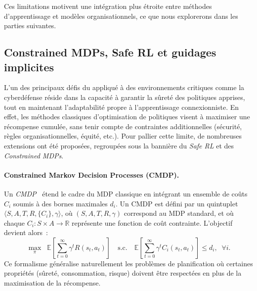 Ces limitations motivent une intégration plus étroite entre méthodes d'apprentissage et modèles organisationnels, ce que nous explorerons dans les parties suivantes.



\subsection{Constrained MDPs, Safe RL et guidages implicites}

\noindent
L’un des principaux défis du  appliqué à des environnements critiques
comme la cyberdéfense réside dans la capacité à garantir la sûreté des politiques apprises,
tout en maintenant l’adaptabilité propre à l’apprentissage connexionniste.
En effet, les méthodes classiques d’optimisation de politiques visent à maximiser une récompense cumulée,
sans tenir compte de contraintes additionnelles (sécurité, règles organisationnelles, équité, etc.).
Pour pallier cette limite, de nombreuses extensions ont été proposées, regroupées sous la bannière
du \textit{Safe RL} et des \textit{Constrained MDPs}.

\paragraph{Constrained Markov Decision Processes (CMDP).}
Un \textit{CMDP}~\cite{altman1999constrained} étend le cadre du MDP classique en intégrant
un ensemble de coûts $C_i$ soumis à des bornes maximales $d_i$.
Un CMDP est défini par un quintuplet
$\langle S, A, T, R, \{C_i\}, \gamma \rangle$,
où $(S,A,T,R,\gamma)$ correspond au MDP standard, et où
chaque $C_i : S \times A \rightarrow \mathbb{R}$ représente une fonction de coût contrainte.
L’objectif devient alors~:
\[
  \max_{\pi} \;\; \mathbb{E}\!\left[\sum_{t=0}^\infty \gamma^t R(s_t,a_t)\right]
  \quad \text{s.c.} \quad
  \mathbb{E}\!\left[\sum_{t=0}^\infty \gamma^t C_i(s_t,a_t)\right] \leq d_i, \;\; \forall i.
\]
Ce formalisme généralise naturellement les problèmes de planification où certaines propriétés
(sûreté, consommation, risque) doivent être respectées en plus de la maximisation de la récompense.


